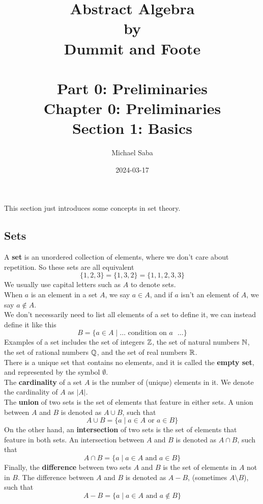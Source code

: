 \documentclass[12pt]{article}
\title{%
    \Huge Abstract Algebra \\
    \large by \\
    \Large Dummit and Foote \\~\\
    \huge Part 0: Preliminaries \\
    \LARGE Chapter 0: Preliminaries \\
    \Large Section 1: Basics
}
\date{2024-03-17}
\author{Michael Saba}
\begin{document}
    \maketitle
    \newpage    
    \setlength{\parindent}{0pt}

    This section just introduces some concepts in set theory. \\

    \subsection*{Sets}

    A \textbf{set} is an unordered collection of elements,
    where we don't care about repetition.
    So these sets are all equivalent
    \[ \{1, 2, 3\} = \{ 1, 3, 2\} = \{ 1, 1, 2, 3, 3 \}  \]
    We usually use capital letters such as $A$ to denote sets. \\
    When $a$ is an element in a set $A$,
    we say $a \in A$, and if $a$ isn't an element of $A$,
    we say $a \notin A$. \\
    We don't necessarily need to list all elements of a set
    to define it, we can instead define it like this
    \[ B = \{ a \in A \mid \dots \text{ condition on $a$ } \dots \} \]
    Examples of a set includes the set of integers $\mathbb{Z}$,
    the set of natural numbers $\mathbb{N}$,
    the set of rational numbers $\mathbb{Q}$,
    and the set of real numbers $\mathbb{R}$. \\

    There is a unique set that contains no elements,
    and it is called the \textbf{empty set},
    and represented by the symbol $\emptyset$. \\
    
    The \textbf{cardinality} of a set $A$ is the number of (unique)
    elements in it.
    We denote the cardinality of $A$ as $|A|$. \\

    The \textbf{union} of two sets is the set of elements
    that feature in either sets.
    A union between $A$ and $B$ is denoted as $A \cup B$, such that
    \[ A \cup B = \{ a \mid a \in A \text{ or } a \in B \} \]
    On the other hand, an \textbf{intersection} of two sets is the set of
    elements that feature in both sets.
    An intersection between $A$ and $B$ is denoted as $A \cap B$, such that
    \[ A \cap B = \{ a \mid a \in A \text{ and } a \in B \} \]
    Finally, the \textbf{difference} between two sets $A$ and $B$
    is the set of elements in $A$ not in $B$.
    The difference between $A$ and $B$ is denoted as $A - B$,
    (sometimes $A \setminus B$), such that
    \[ A - B = \{ a \mid a \in A \text{ and } a \notin B \} \]
    \\
\end{document}
